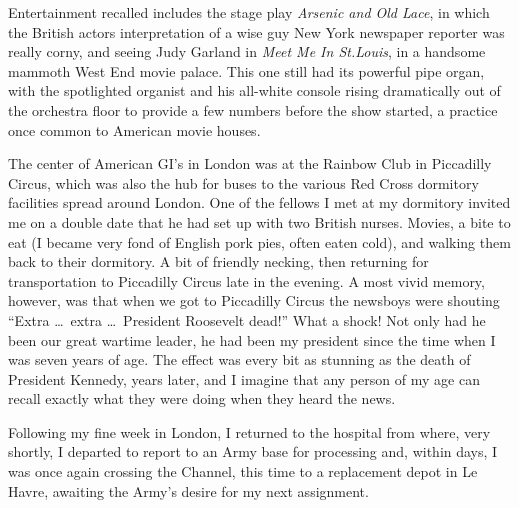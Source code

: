 \documentclass[../m3y]{subfiles}
\begin{document}
Entertainment recalled includes the stage play \emph{Arsenic and Old Lace}, in which the British actors interpretation of a wise guy New York newspaper reporter was really corny, and seeing Judy Garland in \emph{Meet Me In St.\@ Louis}, in a handsome mammoth West End movie palace. This one still had its powerful pipe organ, with the spotlighted organist and his all-white console rising dramatically out of the orchestra floor to provide a few numbers before the show started, a practice once common to American movie houses.

The center of American GI's in London was at the Rainbow Club in Piccadilly Circus, which was also the hub for buses to the various Red Cross dormitory facilities spread around London. One of the fellows I met at my dormitory invited me on a double date that he had set up with two British nurses. Movies, a bite to eat (I became very fond of English pork pies, often eaten cold), and walking them back to their dormitory. A bit of friendly necking, then returning for transportation to Piccadilly Circus late in the evening. A most vivid memory, however, was that when we got to Piccadilly Circus the newsboys were shouting ``Extra \ldots\ extra \ldots\ President Roosevelt dead!'' What a shock! Not only had he been our great wartime leader, he had been my president since the time when I was seven years of age. The effect was every bit as stunning as the death of President Kennedy, years later, and I imagine that any person of my age can recall exactly what they were doing when they heard the news.

Following my fine week in London, I returned to the hospital from where, very shortly, I departed to report to an Army base for processing and, within days, I was once again crossing the Channel, this time to a replacement depot in Le Havre, awaiting the Army's desire for my next assignment.
\end{document}
